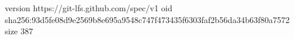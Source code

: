 version https://git-lfs.github.com/spec/v1
oid sha256:93d5fe08d9e2569b8e695a9548c747f473435f6303faf2b56da34b63f80a7572
size 387
